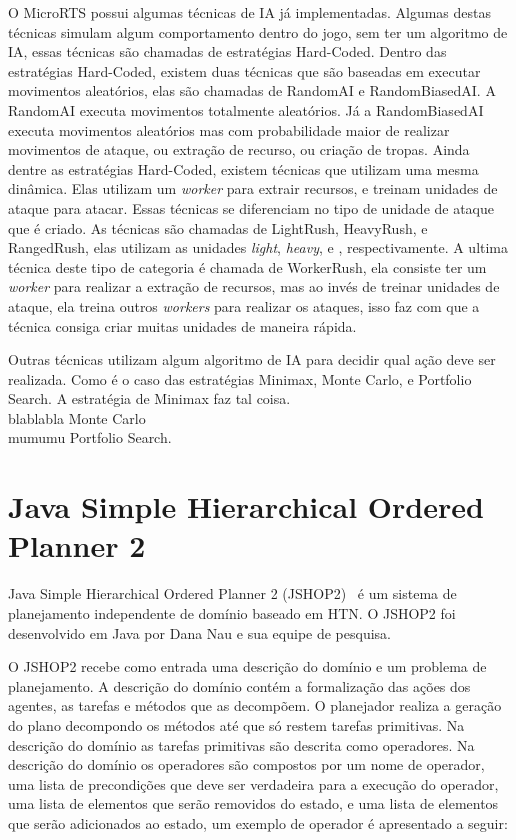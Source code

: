 O MicroRTS possui algumas técnicas de IA já implementadas.
Algumas destas técnicas simulam algum comportamento dentro do jogo, sem ter um algoritmo de IA, essas técnicas são chamadas de estratégias Hard-Coded. 
Dentro das estratégias Hard-Coded, existem duas técnicas que são baseadas em executar movimentos aleatórios, elas são chamadas de RandomAI e RandomBiasedAI.
A RandomAI executa movimentos totalmente aleatórios.
Já a RandomBiasedAI executa movimentos aleatórios mas com probabilidade maior de realizar movimentos de ataque, ou extração de recurso, ou criação de tropas.
Ainda dentre as estratégias Hard-Coded, existem técnicas que utilizam uma mesma dinâmica. 
Elas utilizam um \textit{worker} para extrair recursos, e treinam unidades de ataque para atacar. 
Essas técnicas se diferenciam no tipo de unidade de ataque que é criado. 
As técnicas são chamadas de LightRush, HeavyRush, e RangedRush, elas utilizam as unidades \textit{light}, \textit{heavy}, e , respectivamente.
A ultima técnica deste tipo de categoria é chamada de WorkerRush, ela consiste ter um \textit{worker} para realizar a extração de recursos, mas ao invés de treinar unidades de ataque, ela treina outros \textit{workers} para realizar os ataques, isso faz com que a técnica consiga criar muitas unidades de maneira rápida.

Outras técnicas utilizam algum algoritmo de IA para decidir qual ação deve ser realizada.
Como é o caso das estratégias Minimax, Monte Carlo, e Portfolio Search.
A estratégia de Minimax faz tal coisa. \\
blablabla Monte Carlo \\
mumumu Portfolio Search.

\section{Java Simple Hierarchical Ordered Planner 2}\label{sec:jshop}
		
Java Simple Hierarchical Ordered Planner 2 (JSHOP2)~\cite{ilghami2006documentation} é um sistema de planejamento independente de domínio baseado em HTN. O JSHOP2 foi desenvolvido em Java por Dana Nau e sua equipe de pesquisa. 

O JSHOP2 recebe como entrada uma descrição do domínio e um problema de planejamento. 
A descrição do domínio contém a formalização das ações dos agentes, as tarefas e métodos que as decompõem.
O planejador realiza a geração do plano decompondo os métodos até que só restem tarefas primitivas. Na descrição do domínio as tarefas primitivas são descrita como operadores. Na descrição do domínio os operadores são compostos por um nome de operador, uma lista de precondições que deve ser verdadeira para a execução do operador, uma lista de elementos que serão removidos do estado, e uma lista de elementos que serão adicionados ao estado, um exemplo de operador é apresentado a seguir:

